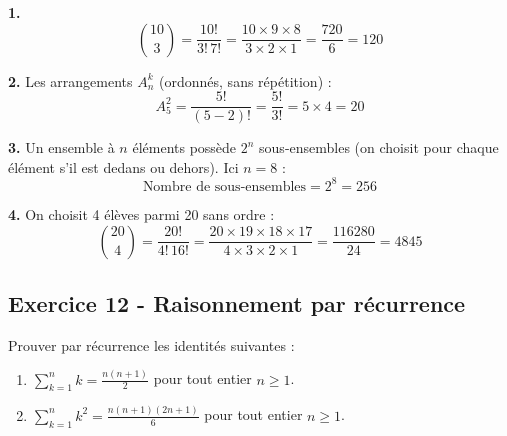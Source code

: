 \documentclass[12pt,a4paper]{article}
\begin{document}
\begin{boitecorrige}
\textbf{1.}
\[
\binom{10}{3} = \frac{10!}{3!\,7!} = \frac{10\times9\times8}{3\times2\times1} = \frac{720}{6} = 120
\]

\textbf{2.} Les arrangements $A_n^k$ (ordonnés, sans répétition) :
\[
A_5^2 = \frac{5!}{(5-2)!} = \frac{5!}{3!} = 5\times4 = 20
\]

\textbf{3.} Un ensemble à $n$ éléments possède $2^n$ sous-ensembles (on choisit pour chaque élément s'il est dedans ou dehors). Ici $n = 8$ :
\[
\text{Nombre de sous-ensembles} = 2^8 = 256
\]

\textbf{4.} On choisit 4 élèves parmi 20 sans ordre :
\[
\binom{20}{4} = \frac{20!}{4!\,16!} = \frac{20\times19\times18\times17}{4\times3\times2\times1} = \frac{116280}{24} = 4845
\]
\end{boitecorrige}

\subsection*{Exercice 12 - Raisonnement par récurrence \niveau{\moyen}}

\begin{boiteexercice}
Prouver par récurrence les identités suivantes :
\begin{enumerate}
  \item $\displaystyle\sum_{k=1}^{n} k = \frac{n(n+1)}{2}$ pour tout entier $n\geq1$.
  \item $\displaystyle\sum_{k=1}^{n} k^2 = \frac{n(n+1)(2n+1)}{6}$ pour tout entier $n\geq1$.
\end{enumerate}
\end{boiteexercice}
\end{document}
